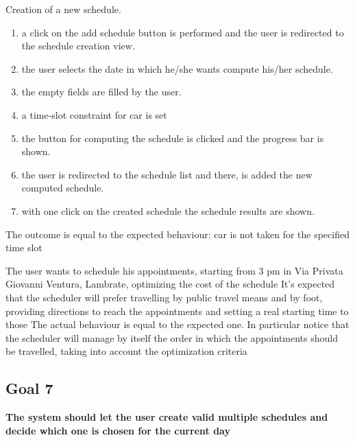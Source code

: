 {Creation of a new schedule.}
{{\begin{enumerate}
\item a click on the add schedule button is performed and the user is redirected to the schedule creation view.
\item the user selects the date in which he/she wants compute his/her schedule.
\item the empty fields are filled by the user.
\item a time-slot constraint for car is set
\item the button for computing the schedule is clicked and the progress bar is shown.
\item the user is redirected to the schedule list and there, is added the new computed schedule.
\item with one click on the created schedule the schedule results are shown.
\end{enumerate}}}
{The outcome is equal to the expected behaviour: car is not taken for the specified time slot}


{The user wants to schedule his appointments, starting from 3 pm in Via Privata Giovanni Ventura, Lambrate, optimizing the cost of the schedule}
{It's expected that the scheduler will prefer travelling by public travel means and by foot, providing directions to reach the appointments and setting a real starting time to those}
{The actual behaviour is equal to the expected one. In particular notice   that the scheduler will manage by itself the order in which the appointments should be travelled, taking into account the optimization criteria}


\subsection{Goal 7}
\textbf{The system should let the user create valid multiple schedules and decide which one is chosen for the current day}\\


